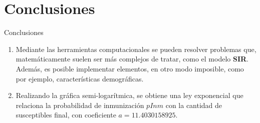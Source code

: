 \documentclass{beamer}
\begin{document}
\section{Conclusiones}
\begin{frame}
\begin{block}{Conclusiones}
\begin{enumerate}
\item Mediante las herramientas computacionales se pueden resolver problemas que, matemáticamente suelen ser más complejos de tratar, como el modelo \textbf{SIR}. Además, es posible implementar elementos, en otro modo imposible, como por ejemplo, características demográficas.

\item Realizando la gráfica semi-logarítmica, se obtiene una ley exponencial que relaciona la probabilidad de inmunización $pInm$ con la cantidad de susceptibles final, con coeficiente $a=11.4030158925$. 
\end{enumerate}
\end{block}
\end{frame}
\end{document}

